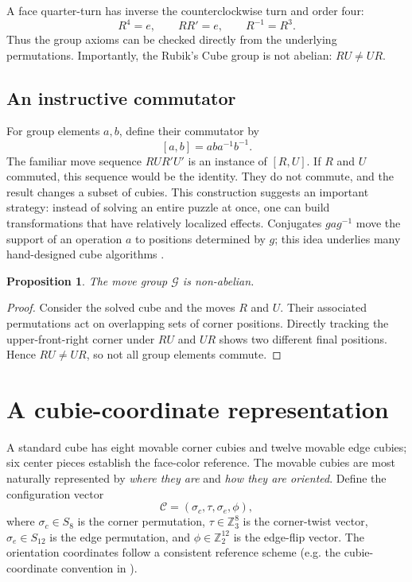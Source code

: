 \documentclass[11pt,a4paper]{article}
\newtheorem{proposition}[theorem]{Proposition}
\theoremstyle{definition}
\theoremstyle{remark}
\newcommand{\Z}{\mathbb{Z}}
\newcommand{\G}{\mathcal{G}}
\newcommand{\C}{\mathcal{C}}
\begin{document}
A face quarter-turn has inverse the counterclockwise turn and order four:
\begin{equation}
R^4=e,\qquad RR'=e,\qquad R^{-1}=R^3.
\end{equation}
Thus the group axioms can be checked directly from the underlying permutations. Importantly, the Rubik's Cube group is not abelian: $RU\neq UR$.

\subsection{An instructive commutator}
For group elements $a,b$, define their commutator by
\begin{equation}\label{eq:commutator}
[a,b]=aba^{-1}b^{-1}.
\end{equation}
The familiar move sequence $RUR'U'$ is an instance of $[R,U]$. If $R$ and $U$ commuted, this sequence would be the identity. They do not commute, and the result changes a subset of cubies. This construction suggests an important strategy: instead of solving an entire puzzle at once, one can build transformations that have relatively localized effects. Conjugates $gag^{-1}$ move the support of an operation $a$ to positions determined by $g$; this idea underlies many hand-designed cube algorithms \citep{joyner2008}.

\begin{proposition}
The move group $\G$ is non-abelian.
\end{proposition}
\begin{proof}
Consider the solved cube and the moves $R$ and $U$. Their associated permutations act on overlapping sets of corner positions. Directly tracking the upper-front-right corner under $RU$ and $UR$ shows two different final positions. Hence $RU\neq UR$, so not all group elements commute.
\end{proof}

\section{A cubie-coordinate representation}
A standard cube has eight movable corner cubies and twelve movable edge cubies; six center pieces establish the face-color reference. The movable cubies are most naturally represented by \emph{where they are} and \emph{how they are oriented}. Define the configuration vector
\begin{equation}\label{eq:state}
\C=(\sigma_c,\tau,\sigma_e,\phi),
\end{equation}
where $\sigma_c\in S_8$ is the corner permutation, $\tau\in\Z_3^8$ is the corner-twist vector, $\sigma_e\in S_{12}$ is the edge permutation, and $\phi\in\Z_2^{12}$ is the edge-flip vector. The orientation coordinates follow a consistent reference scheme (e.g. the cubie-coordinate convention in \citealp{kociemba2phase}).
\end{document}
